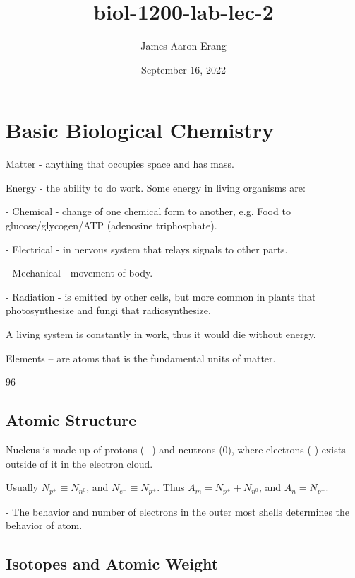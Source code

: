 \documentclass[12pt, UTF8]{article}
\title{biol-1200-lab-lec-2}
\author{James Aaron Erang}
\date{September 16, 2022}
\begin{document}
	\maketitle
	
	\section{Basic Biological Chemistry}
	
	Matter - anything that occupies space and has mass.
	
	Energy - the ability to do work. Some energy in living organisms are:
	
	- Chemical - change of one chemical form to another, e.g. Food to glucose/glycogen/ATP (adenosine triphosphate).
	
	- Electrical - in nervous system that relays signals to other parts.
	
	- Mechanical - movement of body.
	
	- Radiation - is emitted by other cells, but more common in plants that photosynthesize and fungi that radiosynthesize.
	
	A living system is constantly in work, thus it would die without energy.
	
	Elements -- are atoms that is the fundamental units of matter.
	
	96\\%
	
	\subsection*{Atomic Structure}
	
	Nucleus is made up of protons (+) and neutrons (0), where electrons (-) exists outside of it in the electron cloud.
	
	Usually $N_{p^{+}} \equiv N_{n^{0}}$, and $N_{e^{-}} \equiv N_{p^{+}}$. Thus $A_{m} = N_{p^{+}} + N_{n^{0}}$, and $A_{n} = N_{p^{+}}$.
	
	- The behavior and number of electrons in the outer most shells determines the behavior of atom.
	
	\subsection*{Isotopes and Atomic Weight}
	
\end{document}
